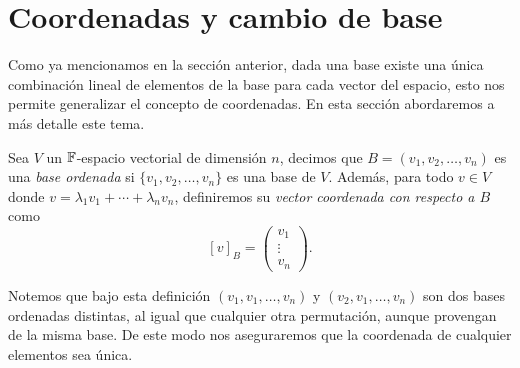 \section{Coordenadas y cambio de base}

Como ya mencionamos en la sección anterior, dada una base existe una única combinación lineal de elementos de la base para cada vector del espacio, esto nos permite generalizar el concepto de coordenadas. En esta sección abordaremos a más detalle este tema.


\begin{defi}
  Sea $V$ un $\mathbb{F}$-espacio vectorial de dimensión $n$, decimos que $B = (v_1, v_2, \ldots, v_n)$ es una \emph{base ordenada} si $\{v_1, v_2, \ldots, v_n\}$ es una base de $V$. Además, para todo $v \in V$ donde $v = \lambda_1 v_1 + \cdots + \lambda_n v_n$, definiremos su \emph{vector coordenada con respecto a $B$} como
    \[ [v]_B = \begin{pmatrix}
      v_1 \\ \vdots \\ v_n
    \end{pmatrix}.\]
\end{defi}

Notemos que bajo esta definición $(v_1, v_1, \ldots, v_n)$ y $(v_2, v_1, \ldots, v_n)$ son dos bases ordenadas distintas, al igual que cualquier otra permutación, aunque provengan de la misma base. De este modo nos aseguraremos que la coordenada de cualquier elementos sea única.

